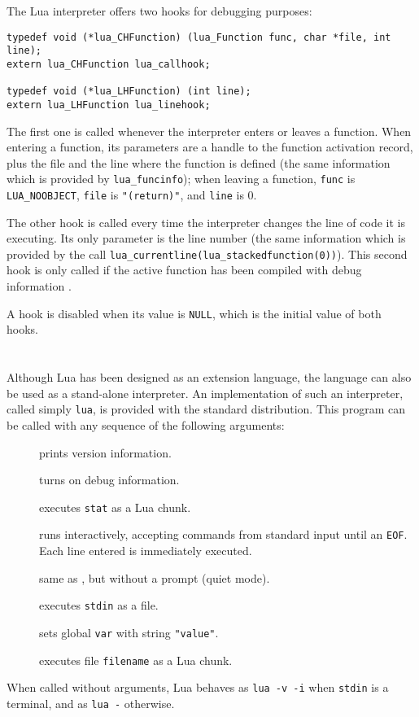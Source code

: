 The Lua interpreter offers two hooks for debugging purposes:
\begin{verbatim}
typedef void (*lua_CHFunction) (lua_Function func, char *file, int line);
extern lua_CHFunction lua_callhook;

typedef void (*lua_LHFunction) (int line);
extern lua_LHFunction lua_linehook;
\end{verbatim}
The first one is called whenever the interpreter enters or leaves a
function.
When entering a function,
its parameters are a handle to the function activation record,
plus the file and the line where the function is defined (the same
information which is provided by \verb|lua_funcinfo|);
when leaving a function, \verb|func| is \verb|LUA_NOOBJECT|,
\verb|file| is \verb|"(return)"|, and \verb|line| is 0.

The other hook is called every time the interpreter changes
the line of code it is executing.
Its only parameter is the line number
(the same information which is provided by the call
\verb|lua_currentline(lua_stackedfunction(0))|).
This second hook is only called if the active function
has been compiled with debug information .

A hook is disabled when its value is \verb|NULL|,
which is the initial value of both hooks.



\section{} \label{lua-sa}

Although Lua has been designed as an extension language,
the language can also be used as a stand-alone interpreter.
An implementation of such an interpreter,
called simply \verb|lua|,
is provided with the standard distribution.
This program can be called with any sequence of the following arguments:
\begin{description}
\item[] prints version information.
\item[] turns on debug information.
\item[] executes \verb|stat| as a Lua chunk.
\item[] runs interactively,
accepting commands from standard input until an \verb|EOF|.
Each line entered is immediately executed.
\item[] same as , but without a prompt (quiet mode).
\item[\T{-}] executes \verb|stdin| as a file.
\item[] sets global \verb|var| with string \verb|"value"|.
\item[] executes file \verb|filename| as a Lua chunk.
\end{description}
When called without arguments,
Lua behaves as \verb|lua -v -i| when \verb|stdin| is a terminal,
and as \verb|lua -| otherwise.

